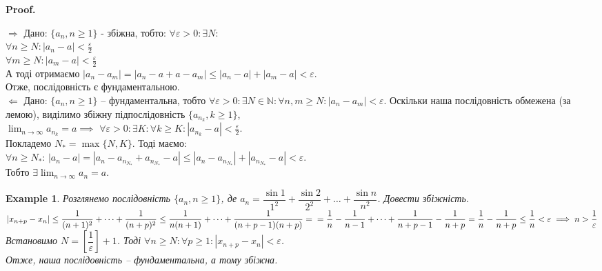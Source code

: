 \documentclass[a4paper, 14pt]{article}
\makeatletter
\def\qed{$\blacksquare$}
\def\rightproof{$\boxed{\Rightarrow}$ }
\def\leftproof{$\boxed{\Leftarrow}$ }
\theoremstyle{theoremdd}
\theoremstyle{theoremdd}
\theoremstyle{theoremdd}
\theoremstyle{theoremdd}
\newtheorem{example}[theorem]{Example}
\theoremstyle{theoremdd}
\theoremstyle{theoremdd}
\theoremstyle{theoremdd}
\theoremstyle{theoremdd}
\renewenvironment{proof}[1][Proof.\\]{\par
\pushQED{\hfill \qed}%
\normalfont \topsep6\p@\@plus6\p@\relax
\trivlist
\item\relax
{\bfseries
#1\@addpunct{.}}\hspace\labelsep\ignorespaces
}{%
\popQED\endtrivlist\@endpefalse
}
\makeatother
\begin{document}
	\begin{proof}
	\rightproof Дано: $\{a_n,n \geq 1\}$ - збіжна, тобто: $\forall \varepsilon >0: \exists N: $\\
	$\displaystyle \forall n \geq N: |a_n - a| < \frac{\varepsilon}{2}$\\
	$\displaystyle \forall m \geq N: |a_m - a| < \frac{\varepsilon}{2}$\\
	А тоді отримаємо $|a_n - a_m| = |a_n - a + a - a_m| \leq |a_n - a| + |a_m - a| < \varepsilon$.\\
	Отже, послідовність є фундаментальною.
	\bigskip \\
	\leftproof Дано: $\{a_n, n \geq 1\}$ -- фундаментальна, тобто $\forall \varepsilon > 0: \exists N \in \mathbb{N}: \forall n,m \geq N: |a_n - a_m| < \varepsilon$. Оскільки наша послідовність обмежена (за лемою), виділимо збіжну підпослідовність $\{a_{n_k}, k \geq 1\}$, \\ $\displaystyle \lim_{n \to \infty} a_{n_k} = a \implies$
	$\displaystyle \forall \varepsilon > 0: \exists K: \forall k \geq K: |a_{n_k} - a| < \frac{\varepsilon}{2}$.\\
	Покладемо $N_* = \max\{N,K\}$. Тоді маємо: \\
	$\forall n \geq N_*$: $|a_n - a| = |a_n - a_{n_{N_*}} + a_{n_{N_*}} - a| \leq |a_n - a_{n_{N_*}}| + |a_{n_{N_*}} - a| < \varepsilon$.\\
	Тобто $\displaystyle \exists \lim_{n \to \infty} a_n = a$.
	\end{proof}
	
	\begin{example}
	Розглянемо послідовність $\{a_n, n \geq 1\}$, де $a_n = \dfrac{\sin 1}{1^2} + \dfrac{\sin 2}{2^2} + \dots + \dfrac{\sin n}{n^2}$. Довести збіжність.\\
	$|x_{n+p} - x_n| \leq \dfrac{1}{(n+1)^2} + \dots + \dfrac{1}{(n+p)^2} \leq \dfrac{1}{n(n+1)} + \dots + \dfrac{1}{(n+p-1)(n+p)} = \\ = \dfrac{1}{n} - \dfrac{1}{n-1} + \dots + \dfrac{1}{n+p-1} - \dfrac{1}{n+p} = \dfrac{1}{n} - \dfrac{1}{n+p} \leq \dfrac{1}{n} < \varepsilon \implies n > \dfrac{1}{\varepsilon}$\\
	Встановимо $N = \left[ \dfrac{1}{\varepsilon} \right] + 1$. Тоді $\forall n \geq N: \forall p \geq 1: |x_{n+p} - x_n| < \varepsilon$.\\
	Отже, наша послідовність -- фундаментальна, а тому збіжна.
	\end{example}
	
\end{document}
